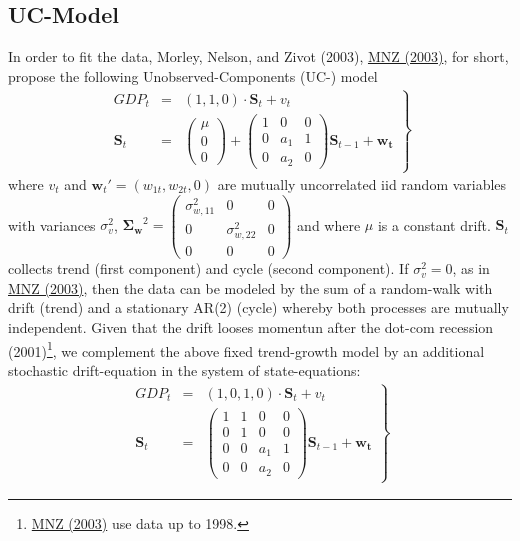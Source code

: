 \documentclass[a4paper]{book}
\begin{document}
\subsection{UC-Model}

In order to fit the data,  Morley, Nelson, and Zivot (2003), \href{https://www.dropbox.com/s/1qn5h7s02c86j8i/mnz03.pdf?dl=0}{MNZ (2003)}, for short, propose the following Unobserved-Components (UC-) model
\begin{eqnarray}
\left.\begin{array}{ccc}
GDP_t&=&(1,1,0)\cdot\mathbf{S}_t+{v}_t\\
\mathbf{S}_t&=&\left(\begin{array}{c}\mu\\0\\0\end{array}\right)+\left(\begin{array}{ccc}1&0&0\\                           
                            0&a_1&1\\
                            0&a_2&0
                            \end{array}\right)\mathbf{S}_{t-1}+\mathbf{w_t}\end{array}\right\}\label{ss_mod_gen_i1}
\end{eqnarray}
where $v_t$ and $\mathbf{w}_t'=(w_{1t},w_{2t},0)$ are mutually uncorrelated iid random variables with variances $\sigma_v^2$, $\boldsymbol{\Sigma_w}^2=\left(\begin{array}{ccc}\sigma_{w,11}^2&0&0\\0&\sigma_{w,22}^2&0\\0&0&0\end{array}\right)$ and where $\mu$ is a constant drift. $\mathbf{S}_t$ collects trend (first component) and cycle (second component). If $\sigma_v^2=0$, as in \href{https://www.dropbox.com/s/1qn5h7s02c86j8i/mnz03.pdf?dl=0}{MNZ (2003)}, then  the data can be modeled by the sum of a random-walk with drift (trend) and a stationary AR(2) (cycle) whereby both processes are mutually independent. Given that the drift looses momentun after the dot-com recession (2001)\footnote{\href{https://www.dropbox.com/s/1qn5h7s02c86j8i/mnz03.pdf?dl=0}{MNZ (2003)} use data up to 1998.},  we complement the above fixed trend-growth model by an additional stochastic drift-equation in the system of state-equations:
\begin{eqnarray}
\left.\begin{array}{ccc}GDP_t&=&(1,0,1,0)\cdot\mathbf{S}_t+v_t\\
\mathbf{S}_t&=&\left(\begin{array}{cccc}1&1&0&0\\
                            0&1&0&0\\
                            0&0&a_1&1\\
                            0&0&a_2&0
                            \end{array}\right)\mathbf{S}_{t-1}+\mathbf{w_t}\end{array}\right\}\label{ss_mod_gen_i2}
\end{eqnarray}
\end{document}
